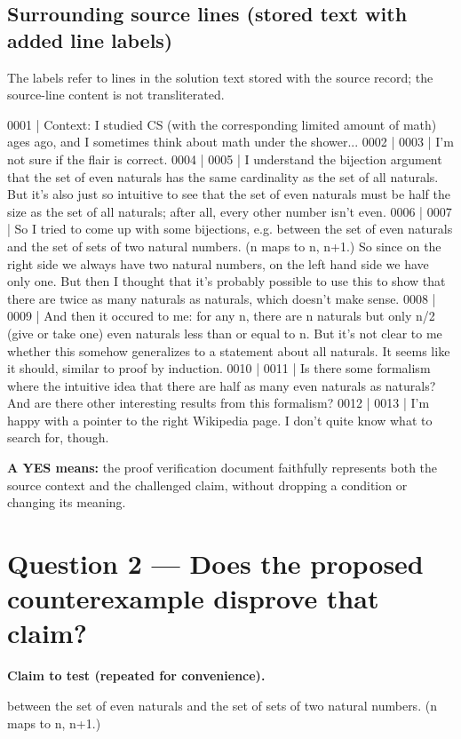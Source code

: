 \documentclass[11pt]{article}
\begin{document}
\subsection*{Surrounding source lines (stored text with added line labels)}
The labels refer to lines in the solution text stored with the source record; the source-line content is not transliterated.
\begin{Vsrc}
0001 | Context: I studied CS (with the corresponding limited amount of math) ages ago, and I sometimes think about math under the shower...
0002 | 
0003 | I'm not sure if the flair is correct.
0004 | 
0005 | I understand the bijection argument that the set of even naturals has the same cardinality as the set of all naturals.  But it's also just so intuitive to see that the set of even naturals must be half the size as the set of all naturals; after all, every other number isn't even.
0006 | 
0007 | So I tried to come up with some bijections, e.g. between the set of even naturals and the set of sets of two natural numbers.  (n maps to {n, n+1}.)  So since on the right side we always have two natural numbers, on the left hand side we have only one.  But then I thought that it's probably possible to use this to show that there are twice as many naturals as naturals, which doesn't make sense.
0008 | 
0009 | And then it occured to me: for any n, there are n naturals but only n/2 (give or take one) even naturals less than or equal to n.  But it's not clear to me whether this somehow generalizes to a statement about all naturals.  It seems like it should, similar to proof by induction.
0010 | 
0011 | Is there some formalism where the intuitive idea that there are half as many even naturals as naturals?  And are there other interesting results from this formalism?
0012 | 
0013 | I'm happy with a pointer to the right Wikipedia page.  I don't quite know what to search for, though.
\end{Vsrc}
\textbf{A YES means:} the proof verification document faithfully represents both the source context and the challenged claim, without dropping a condition or changing its meaning.
\section*{Question 2 --- Does the proposed counterexample disprove that claim?}
\textbf{Claim to test (repeated for convenience).}
\begin{Vsrc}
between the set of even naturals and the set of sets of two natural numbers.  (n maps to {n, n+1}.)
\end{Vsrc}
\end{document}
